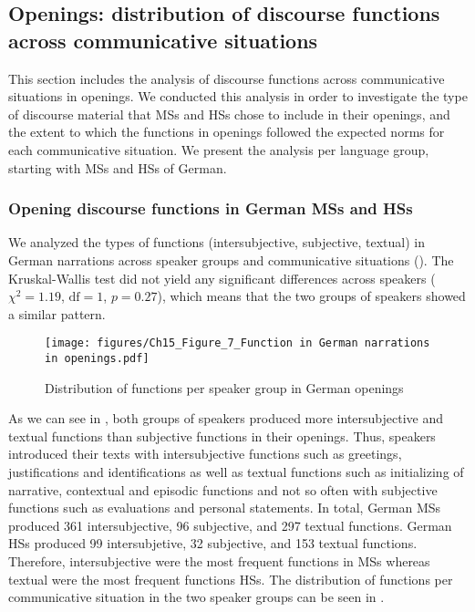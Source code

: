 \documentclass[output=paper,colorlinks,citecolor=brown]{langscibook}
\begin{document}
\subsection{Openings: distribution of discourse functions across communicative situations}
This section includes the analysis of discourse functions across communicative situations in openings. We conducted this analysis in order to investigate the type of discourse material that MSs and HSs chose to include in their openings, and the extent to which the functions in openings followed the expected norms for each communicative situation. We present the analysis per language group, starting with MSs and HSs of German. 

\subsubsection{Opening discourse functions in German MSs and HSs}
We analyzed the types of functions (intersubjective, subjective, textual) in German narrations across speaker groups and communicative situations (). The Kruskal-Wallis test did not yield any significant differences across speakers ($\chi^2= 1.19$, $\text{df} = 1$, $p = 0.27$), which means that the two groups of speakers showed a similar pattern.

\begin{figure}
    \centering
    \texttt{[image: figures/Ch15\_Figure\_7\_Function in German narrations in openings.pdf]}
    \caption{Distribution of functions per speaker group in German openings}
    \label{fig:katsikaetal:Germanfunctionsopenings}
\end{figure}

As we can see in , both groups of speakers produced more intersubjective and textual functions than subjective functions in their openings. Thus, speakers introduced their texts with intersubjective functions such as greetings, justifications and identifications as well as textual functions such as initializing of narrative, contextual and episodic functions and not so often with subjective functions such as evaluations and personal statements. In total, German MSs produced 361 intersubjective, 96 subjective, and 297 textual functions. German HSs produced 99 intersubjetive, 32 subjective, and 153 textual functions. Therefore, intersubjective were the most frequent functions in MSs whereas textual were the most frequent functions HSs. The distribution of functions per communicative situation in the two speaker groups can be seen in . 
\end{document}
